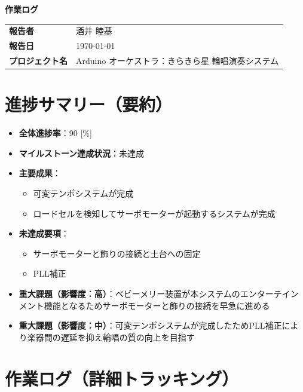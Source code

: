 \documentclass[a4paper,12pt]{ltjsarticle}
\begin{document}
\begin{center}
  {\LARGE\bfseries 作業ログ}
\end{center}

\vspace{4mm}

\begin{tabular}{ll}
  \textbf{報告者} & 酒井 睦基 \\
  \textbf{報告日} & \today \\
  \textbf{プロジェクト名} & Arduino オーケストラ：きらきら星 輪唱演奏システム \\
\end{tabular}

\vspace{6mm}

\section{進捗サマリー（要約）}

\begin{itemize}
  \item \textbf{全体進捗率}：90 [\%]
  \item \textbf{マイルストーン達成状況}：未達成
  \item \textbf{主要成果}：
    \begin{itemize}
      \item 可変テンポシステムが完成
      \item ロードセルを検知してサーボモーターが起動するシステムが完成
    \end{itemize}
  \item \textbf{未達成要項}：
    \begin{itemize}
      \item サーボモーターと飾りの接続と土台への固定
      \item PLL補正
    \end{itemize}
  \item \textbf{重大課題（影響度：高）}：ベビーメリー装置が本システムのエンターテインメント機能となるためサーボモーターと飾りの接続を早急に進める
  \item \textbf{重大課題（影響度：中）}：可変テンポシステムが完成したためPLL補正により楽器間の遅延を抑え輪唱の質の向上を目指す
\end{itemize}

\section{作業ログ（詳細トラッキング）}
\end{document}
